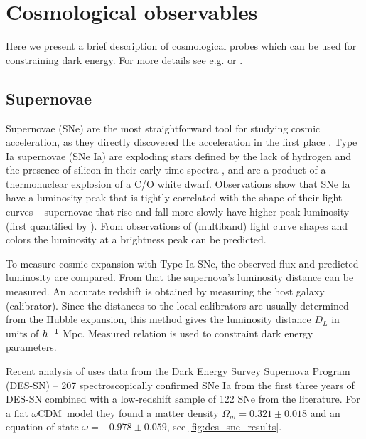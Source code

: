 \section{Cosmological observables}
Here we present a brief description of cosmological probes which can be used for constraining dark energy. For more details see e.g. \textcite{weinberg_observational_2013} or \textcite{DE_probes2}.
\subsection{Supernovae}
Supernovae (SNe) are the most straightforward tool for studying cosmic acceleration, as they directly discovered the acceleration in the first place \parencite{riess}. Type Ia supernovae (SNe Ia) are exploding stars defined by the lack of hydrogen and the presence of silicon in their early-time spectra \parencite{SN}, and are a product of a thermonuclear explosion of a C/O white dwarf. Observations show that SNe Ia have a luminosity peak that is tightly correlated with the shape of their light curves -- supernovae that rise and fall more slowly have higher peak luminosity (first quantified by \cite{SN_lum}). From observations of (multiband) light curve shapes and colors the luminosity at a brightness peak can be predicted.

To measure cosmic expansion with Type Ia SNe, the observed flux and predicted luminosity are compared. From that the supernova's luminosity distance can be measured. An accurate redshift is obtained by measuring the host galaxy (calibrator). Since the distances to the local calibrators are usually determined from the Hubble expansion, this method gives the luminosity distance $D_L$ in units of $h^{-1}$ Mpc. Measured relation is used to constraint dark energy parameters.

Recent analysis of \textcite{Abbott_2019} uses data from the Dark Energy Survey Supernova Program (DES-SN) -- 207 spectroscopically confirmed SNe Ia from the first three years of DES-SN combined with a low-redshift sample of 122 SNe from the literature. For a flat $\omega$CDM\ model they found a matter density $\Omega_m=0.321\pm0.018$ and an equation of state $\omega=-0.978\pm0.059$, see \autoref{fig:des_sne_results}.

